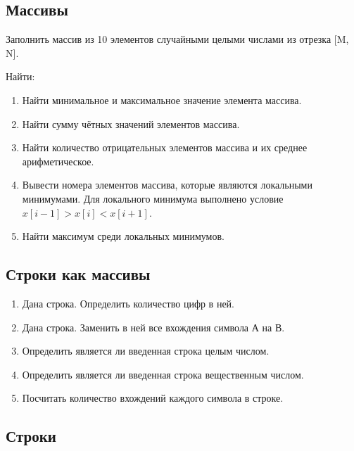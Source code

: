 \subsection{Массивы}

Заполнить массив из 10 элементов случайными целыми числами из отрезка [M, N].

Найти:
\begin{enumerate}
  \item Найти минимальное и максимальное значение элемента массива.
  \item Найти сумму чётных значений элементов массива.
  \item Найти количество отрицательных элементов массива и их среднее арифметическое.
  \item Вывести номера элементов массива, которые являются локальными минимумами. Для локального минимума выполнено условие $x[i-1] > x[i] < x[i+1]$.
  \item Найти максимум среди локальных минимумов.
\end{enumerate}

\subsection{Строки как массивы}

\begin{enumerate}
  \item Дана строка. Определить количество цифр в ней.
  \item Дана строка. Заменить в ней все вхождения символа А на В.
  \item Определить является ли введенная строка целым числом.
  \item Определить является ли введенная строка вещественным числом.
  \item Посчитать количество вхождений каждого символа в строке.
\end{enumerate}

\subsection{Строки}

